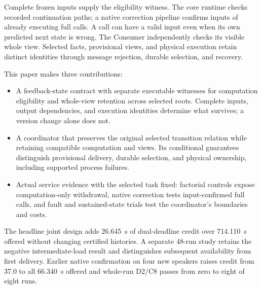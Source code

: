 Complete frozen inputs supply the eligibility witness. The core runtime
checks recorded continuation paths; a native correction pipeline confirms
inputs of already executing full calls. A call can have a valid input
even when its own predicted next state is wrong. The Consumer independently
checks its visible whole view. Selected facts, provisional views, and
physical execution retain distinct identities through message rejection,
durable selection, and recovery.

This paper makes three contributions:
\begin{itemize}
\item A feedback-state contract with separate executable witnesses for
  computation eligibility and whole-view retention across selected roots.
  Complete inputs, output dependencies, and execution identities determine
  what survives; a version change alone does not.
\item A coordinator that preserves the original selected transition relation
  while retaining compatible computation and views. Its conditional
  guarantees distinguish provisional delivery, durable selection, and
  physical ownership, including supported process failures.
\item Actual service evidence with the selected task fixed: factorial
  controls expose computation-only withdrawal, native correction tests
  input-confirmed full calls, and fault and sustained-state trials test
  the coordinator's boundaries and costs.
\end{itemize}

The headline joint design adds 26.645~s of dual-deadline credit over
714.110~s offered without changing certified histories. A separate 48-run
study retains the negative intermediate-load result and distinguishes
subsequent availability from first delivery. Earlier native confirmation
on four new speakers raises credit from 37.0 to all 66.340~s offered
and whole-run D2/C8 passes from zero to eight of eight runs.
